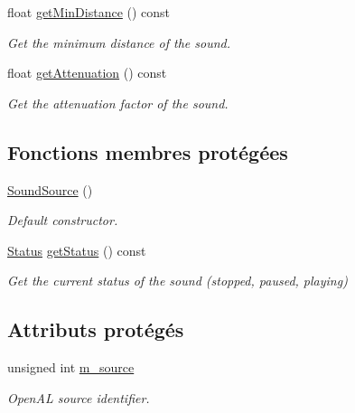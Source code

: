 \begin{DoxyCompactItemize}
float \hyperlink{classsf_1_1SoundSource_a605ca7f359ec1c36fcccdcd4696562ac}{get\+Min\+Distance} () const
\begin{DoxyCompactList}\small\item\em Get the minimum distance of the sound. \end{DoxyCompactList}\item 
float \hyperlink{classsf_1_1SoundSource_a8ad7dafb4f1b4afbc638cebe24f48cc9}{get\+Attenuation} () const
\begin{DoxyCompactList}\small\item\em Get the attenuation factor of the sound. \end{DoxyCompactList}\end{DoxyCompactItemize}
\subsection*{Fonctions membres protégées}
\begin{DoxyCompactItemize}
\item 
\hyperlink{classsf_1_1SoundSource_aefa4bd4460f387d81a0637d293979436}{Sound\+Source} ()
\begin{DoxyCompactList}\small\item\em Default constructor. \end{DoxyCompactList}\item 
\hyperlink{classsf_1_1SoundSource_ac43af72c98c077500b239bc75b812f03}{Status} \hyperlink{classsf_1_1SoundSource_a7e47072bd8b3982c708a6151f298d21a}{get\+Status} () const
\begin{DoxyCompactList}\small\item\em Get the current status of the sound (stopped, paused, playing) \end{DoxyCompactList}\end{DoxyCompactItemize}
\subsection*{Attributs protégés}
\begin{DoxyCompactItemize}
\item 
\mbox{\label{classsf_1_1SoundSource_a0223cef4b1c587e6e1e17b4c92c4479c}} 
unsigned int \hyperlink{classsf_1_1SoundSource_a0223cef4b1c587e6e1e17b4c92c4479c}{m\+\_\+source}
\begin{DoxyCompactList}\small\item\em Open\+AL source identifier. \end{DoxyCompactList}\end{DoxyCompactItemize}


